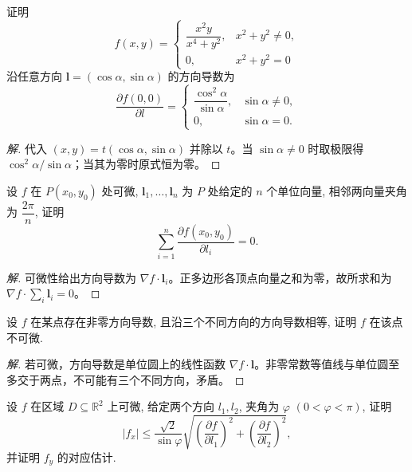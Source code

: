\documentclass[../../数学分析培优讲义(答案版).tex]{subfiles}
\begin{document}
\begin{example}
证明
\[
    f(x,y)=
    \begin{cases}
        \dfrac{x^2y}{x^4+y^2}, & x^2+y^2\ne0,\\
        0, & x^2+y^2=0
    \end{cases}
\]
沿任意方向 $\bm l=(\cos\alpha,\sin\alpha)$ 的方向导数为
\[
    \dfrac{\partial f(0,0)}{\partial l}
    =\begin{cases}
        \dfrac{\cos^2\alpha}{\sin\alpha}, & \sin\alpha\ne0,\\
        0, & \sin\alpha=0.
    \end{cases}
\]
\end{example}

\begin{proof}[解]
代入 $(x,y)=t(\cos\alpha,\sin\alpha)$ 并除以 $t$。当 $\sin\alpha\ne0$ 时取极限得 $\cos^2\alpha/\sin\alpha$；当其为零时原式恒为零。
\end{proof}

\begin{example}
设 $f$ 在 $P(x_0,y_0)$ 处可微, $\bm l_1,\ldots,\bm l_n$ 为 $P$ 处给定的 $n$ 个单位向量, 相邻两向量夹角为 $\dfrac{2\pi}{n}$, 证明
\[
    \sum\limits_{i=1}^n\dfrac{\partial f(x_0,y_0)}{\partial l_i}=0.
\]
\end{example}

\begin{proof}[解]
可微性给出方向导数为 $\nabla f\cdot\bm l_i$。正多边形各顶点向量之和为零，故所求和为 $\nabla f\cdot\sum_i\bm l_i=0$。
\end{proof}

\begin{example}
设 $f$ 在某点存在非零方向导数, 且沿三个不同方向的方向导数相等, 证明 $f$ 在该点不可微.
\end{example}

\begin{proof}[解]
若可微，方向导数是单位圆上的线性函数 $\nabla f\cdot\bm l$。非零常数等值线与单位圆至多交于两点，不可能有三个不同方向，矛盾。
\end{proof}

\begin{example}
设 $f$ 在区域 $D\subseteq\mathbb{R}^2$ 上可微, 给定两个方向 $l_1,l_2$, 夹角为 $\varphi$ $(0<\varphi<\pi)$, 证明
\[
    |f_x|\leq\dfrac{\sqrt{2}}{\sin\varphi}
    \sqrt{\left(\dfrac{\partial f}{\partial l_1}\right)^2+
    \left(\dfrac{\partial f}{\partial l_2}\right)^2},
\]
并证明 $f_y$ 的对应估计.
\end{example}
\end{document}
